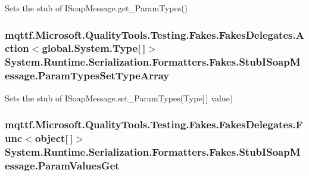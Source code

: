 Sets the stub of I\-Soap\-Message.\-get\-\_\-\-Param\-Types()

\hypertarget{class_system_1_1_runtime_1_1_serialization_1_1_formatters_1_1_fakes_1_1_stub_i_soap_message_a674e294dd91ff8a9e22481c4880d8145}{
\subsubsection[{Param\-Types\-Set\-Type\-Array}]{\setlength{\rightskip}{0pt plus 5cm}mqttf.\-Microsoft.\-Quality\-Tools.\-Testing.\-Fakes.\-Fakes\-Delegates.\-Action$<$global.\-System.\-Type\mbox{[}$\,$\mbox{]}$>$ System.\-Runtime.\-Serialization.\-Formatters.\-Fakes.\-Stub\-I\-Soap\-Message.\-Param\-Types\-Set\-Type\-Array}}\label{class_system_1_1_runtime_1_1_serialization_1_1_formatters_1_1_fakes_1_1_stub_i_soap_message_a674e294dd91ff8a9e22481c4880d8145}


Sets the stub of I\-Soap\-Message.\-set\-\_\-\-Param\-Types(\-Type\mbox{[}$\,$\mbox{]} value)

\hypertarget{class_system_1_1_runtime_1_1_serialization_1_1_formatters_1_1_fakes_1_1_stub_i_soap_message_a960fde6b4f8f5e71146ffc00449aea5a}{
\subsubsection[{Param\-Values\-Get}]{\setlength{\rightskip}{0pt plus 5cm}mqttf.\-Microsoft.\-Quality\-Tools.\-Testing.\-Fakes.\-Fakes\-Delegates.\-Func$<$object\mbox{[}$\,$\mbox{]}$>$ System.\-Runtime.\-Serialization.\-Formatters.\-Fakes.\-Stub\-I\-Soap\-Message.\-Param\-Values\-Get}}\label{class_system_1_1_runtime_1_1_serialization_1_1_formatters_1_1_fakes_1_1_stub_i_soap_message_a960fde6b4f8f5e71146ffc00449aea5a}


